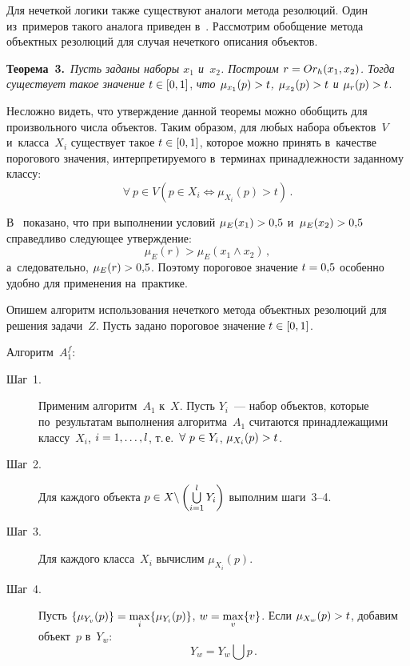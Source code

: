 \begin{multicols}{2}
Для нечеткой логики также существуют аналоги метода резолюций.
Один из~примеров такого аналога приведен в~\cite{lee}.
Рассмотрим обобщение метода объектных резолюций для случая 
нечеткого описания объектов.


\smallskip

\noindent
\textbf{Теорема~3.}\
\textit{Пусть заданы наборы $x_{1}$ и~$x_{2}$.
Построим $ r\hm=Or_{h}(x_1,x_2)$.
Тогда существует такое значение} $t \hm\in [0,1]$, 
\textit{что $ \mu_{x_{1}}(p)\hm > t$, $\mu_{x_{2}}(p) \hm> t$ и $\mu_{r}(p) \hm> t$}.


\smallskip

Несложно видеть, что утверждение данной тео\-ре\-мы можно обобщить для 
произвольного числа объектов.
Таким образом, для любых набора объектов~$V$ 
и~класса~$X_{i}$ существует такое $t \hm\in [0,1]$, 
которое можно принять в~качестве порогового значения, интерпретируемого 
в~терминах принадлежности заданному классу:
$$
 \forall\ p \in V (p \in X_{i} \Leftrightarrow \mu_{X_{i}}(p) > t) \,.
 $$

В~\cite{lee} показано, что при выполнении условий $\mu_{E}(x_{1}) \hm> 0{,}5$ 
и~$ \mu_{E}(x_{2})\hm > 0{,}5 $ справедливо следу\-ющее утверждение:
$$
\mu_{E}(r) > \mu_{E}\left(x_{1} \wedge x_{2}\right) \,, 
$$
а~следовательно, $\mu_{E}(r)\hm > 0{,}5$.
Поэтому пороговое значение $t\hm=0{,}5$ 
особенно удобно для применения на~практике.

Опишем алгоритм использования нечеткого метода объектных резолюций для решения 
задачи~$Z$.
Пусть задано пороговое значение $t \hm\in [0,1]$.

\smallskip

Алгоритм~$ A_{1}^{f} $:
\begin{description}
\item[Шаг~1.] Применим алгоритм~$A_{1} $ к~$ X $.
Пусть $Y_{i} $~--- набор объектов, которые по~результатам выполнения алгоритма~$A_{1}$ 
считаются принадлежащими классу~$X_{i}$, $i\hm=1,\ldots,l $, т.\,е.\
 $\forall\ p \hm\in Y_{i}$, $\mu_{X_{i}}(p)\hm>t$.

\item[Шаг~2.] Для каждого объекта
 $ p\hm \in X \backslash \left(\bigcup\limits_{i=1}^{l} Y_{i}\right)$
выполним шаги~3--4.

\item[Шаг~3.] Для каждого класса~$X_{i}$ вычислим $\mu_{X_{i}}(p)$.

\item[Шаг~4.] Пусть $\{\mu_{Y_{v}}(p) \} \hm= \max\limits_{i} \{ \mu_{Y_{i}}(p) \}$,
 $w\hm = \max\limits_{v} \{v\}$.
Если $\mu_{X_{w}}(p) \hm> t$, добавим объект~$p$ в~$Y_{w}$:
$$ 
Y_{w} = Y_{w} \bigcup p\,. 
$$


\end{description}
\end{multicols}
